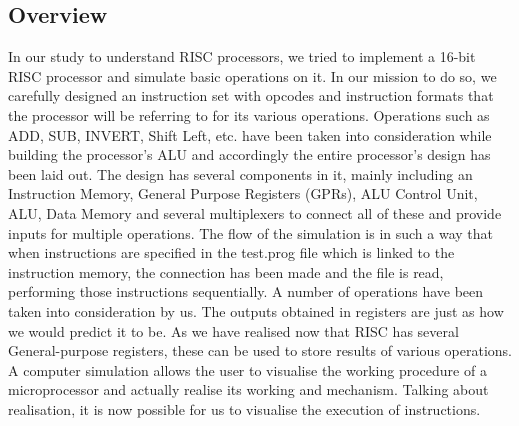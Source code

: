 \documentclass[conference]{IEEEtran}
\begin{document}
\subsection{Overview}
In our study to understand RISC processors, we tried to implement a 16-bit RISC processor and simulate basic operations on it. In our mission to do so, we carefully designed an instruction set with opcodes and instruction formats that the processor will be referring to for its various operations. Operations such as ADD, SUB, INVERT, Shift Left, etc. have been taken into consideration while building the processor’s ALU and accordingly the entire processor’s design has been laid out. The design has several components in it, mainly including an Instruction Memory, General Purpose Registers (GPRs), ALU Control Unit, ALU, Data Memory and several multiplexers to connect all of these and provide inputs for multiple operations. 
The flow of the simulation is in such a way that when instructions are specified in the test.prog file which is linked to the instruction memory, the connection has been made and the file is read, performing those instructions sequentially. 
A number of operations have been taken into consideration by us. The outputs obtained in registers are just as how we would predict it to be. As we have realised now that RISC has several General-purpose registers, these can be used to store results of various operations.
A computer simulation allows the user to visualise the working procedure of a microprocessor and actually realise its working and mechanism. Talking about realisation, it is now possible for us to visualise the execution of instructions.
\end{document}
